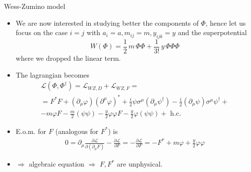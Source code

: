 \documentclass[10pt]{beamer}
\begin{document}
\begin{frame}{Wess-Zumino model}
    \begin{itemize}
        \item We are now interested in studying better the components of $\Phi$, hence let us focus on the case $i=j$ with $a_{i} = a, m_{ij}=m, y_{ijk}=y$ and the superpotential
            \begin{equation*}
                W(\Phi) = \frac{1}{2} \, m \, \Phi\Phi + \frac{1}{3!} \,  y \, \Phi \Phi \Phi
            \end{equation*}
            where we dropped the linear term.
        \item The lagrangian becomes
            \begin{gather*}
                \mathcal{L}(\Phi, \Phi^{\dagger}) = \mathcal{L}_{WZ, D} + \mathcal{L}_{WZ, F} = \\ 
                = F^{*} F+\left(\partial_{\mu} \varphi\right)\left(\partial^{\mu} \varphi\right)^{*}+\frac{i}{2} \psi \sigma^{\mu}\left(\partial_{\mu} \psi^{\dagger}\right)-\frac{i}{2}\left(\partial_{\mu} \psi\right) \sigma^{\mu} \psi^{\dagger} + \\
                    -m \varphi F-\frac{m}{2}(\psi \psi)-\frac{y}{2} \varphi \varphi F-\frac{y}{2} \varphi(\psi \psi)+\text { h.c. }
            \end{gather*}
        \item E.o.m. for $F$ (analogous for $F^{*}$) is
            \begin{gather*}
                0=\partial_{\mu} \frac{\partial \mathcal{L}}{\partial\left(\partial_{\mu} F\right)}-\frac{\partial \mathcal{L}}{\partial F}=-\frac{\partial \mathcal{L}}{\partial F}=-F^{*}+m \varphi+\frac{y}{2} \varphi \varphi
            \end{gather*}
        \item $\Rightarrow$ algebraic equation $\Rightarrow$ $F,F^{*}$ are unphysical. 
    \end{itemize}
\end{frame}
\end{document}
